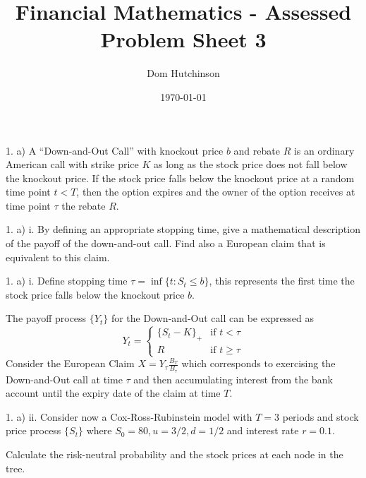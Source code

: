 \documentclass[11pt,a4paper]{article}
\begin{document}
\questionsfalse

\title{Financial Mathematics - Assessed Problem Sheet 3}
\author{Dom Hutchinson}
\date{\today}
\maketitle

\begin{question}{1. a)}
  A ``Down-and-Out Call'' with knockout price $b$ and rebate $R$ is an ordinary American call with strike price $K$ as long as the stock price does not fall below the knockout price. If the stock price falls below the knockout price at a random time point $t<T$, then the option expires and the owner of the option receives at time point $\tau$ the rebate $R$.
\end{question}

\begin{question}{1. a) i.}
  By defining an appropriate stopping time, give a mathematical description of the payoff of the down-and-out call. Find also a European claim that is equivalent to this claim.
\end{question}

\begin{answer}{1. a) i.}
  Define stopping time $\tau=\inf\{t:S_t\leq b\}$, this represents the first time the stock price falls below the knockout price $b$.
  \par The payoff process $\{Y_t\}$ for the Down-and-Out call can be expressed as
  \[ Y_t=\begin{cases}
  \{S_t-K\}_+&\text{if }t<\tau\\
  R&\text{if }t\geq\tau
  \end{cases} \]
  Consider the European Claim $X=Y_\tau\frac{B_T}{B_\tau}$ which corresponds to exercising the Down-and-Out call at time $\tau$ and then accumulating interest from the bank account until the expiry date of the claim at time $T$.
\end{answer}

\begin{question}{1. a) ii.}
  Consider now a Cox-Ross-Rubinstein model with $T=3$ periods and stock price process $\{S_t\}$ where $S_0=80,u=3/2,d=1/2$ and interest rate $r=0.1$.
  \par Calculate the risk-neutral probability and the stock prices at each node in the tree.
\end{question}
\end{document}
